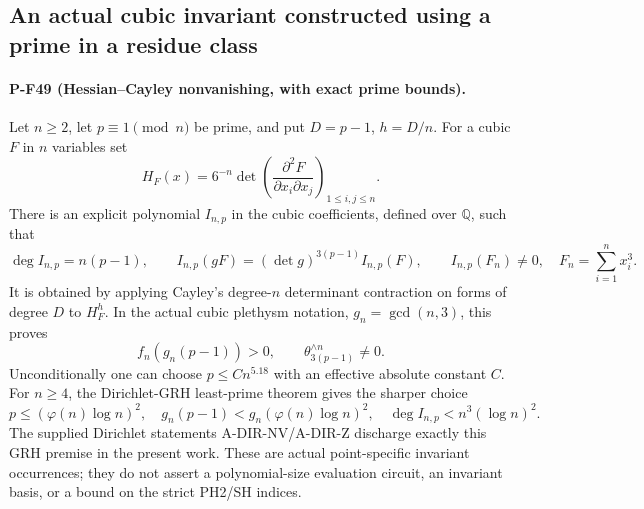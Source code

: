 \subsection{An actual cubic invariant constructed using a prime in a residue class}
\label{sec:hessian-fermat-prime}

\paragraph{P-F49 (Hessian--Cayley nonvanishing, with exact prime bounds).}
Let $n\ge2$, let $p\equiv1\pmod n$ be prime, and put
$D=p-1$, $h=D/n$. For a cubic $F$ in $n$ variables set
\[
       H_F(x)=6^{-n}\det\left(
                   \frac{\partial^2F}{\partial x_i\partial x_j}
                                      \right)_{1\le i,j\le n}.
                                                        \tag{P-F49a}
\]
There is an explicit polynomial $I_{n,p}$ in the cubic
coefficients, defined over $\mathbb Q$, such that
\[
 \deg I_{n,p}=n(p-1),\qquad
 I_{n,p}(gF)=(\det g)^{3(p-1)}I_{n,p}(F),\qquad
 I_{n,p}(F_n)\ne0,\quad F_n=\sum_{i=1}^n x_i^3.
                                                        \tag{P-F49b}
\]
It is obtained by applying Cayley's degree-$n$ determinant
contraction on forms of degree $D$ to $H_F^h$.
In the actual cubic plethysm notation, $g_n=\gcd(n,3)$,
this proves
\[
              f_n(g_n(p-1))>0,
           \qquad \theta_{3(p-1)}^{\wedge n}\ne0.
                                                        \tag{P-F49c}
\]
Unconditionally one can choose $p\le Cn^{5.18}$ with
an effective absolute constant $C$. For $n\ge4$, the
Dirichlet-GRH least-prime theorem gives the sharper choice
\[
      p\le(\varphi(n)\log n)^2,
      \quad g_n(p-1)<g_n(\varphi(n)\log n)^2,
      \quad\deg I_{n,p}<n^3(\log n)^2.                 \tag{P-F49d}
\]
The supplied Dirichlet statements A-DIR-NV/A-DIR-Z
discharge exactly this GRH premise in the present work.
These are actual point-specific invariant occurrences;
they do not assert a polynomial-size evaluation circuit,
an invariant basis, or a bound on the strict PH2/SH indices.

